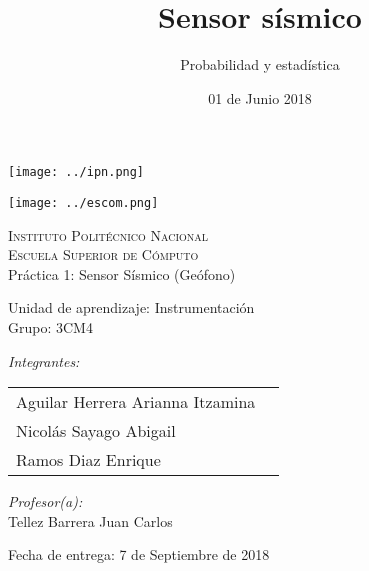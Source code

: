 \documentclass[12pt]{article}
\date{ 01 de Junio 2018}
\title{Sensor sísmico}
\author{Probabilidad y estadística}
\begin{document}
		\begin{titlepage}
			\begin{center}
				
				
				\noindent
				\begin{minipage}{0.5\textwidth}
					\begin{flushleft} \large
						\texttt{[image: ../ipn.png]}
					\end{flushleft}
				\end{minipage}%
				\begin{minipage}{0.55\textwidth}
					\begin{flushright} \large
						\texttt{[image: ../escom.png]}
					\end{flushright}
				\end{minipage}
				
				\textsc{\LARGE Instituto Politécnico Nacional}\\[0.5cm]
				
				\textsc{\Large Escuela Superior de Cómputo}\\[1cm]
				
				
				{ \huge Práctica 1: Sensor Sísmico (Geófono) \\[1cm] }
				
				{ \Large Unidad de aprendizaje: Instrumentación} \\[1cm]
				
				{ \Large Grupo: 3CM4 } \\[1cm]
				
				\noindent
				\begin{minipage}{0.5\textwidth}
					\begin{flushleft} \large
						\emph{Integrantes:}\\
						
						\begin{tabular}{ll}
						Aguilar Herrera Arianna Itzamina \\
					    Nicolás Sayago Abigail\\
					    Ramos Diaz Enrique \\
					\end{tabular}
					\end{flushleft}
				\end{minipage}%
				\begin{minipage}{0.5\textwidth}
					\begin{flushright} \large
						\emph{Profesor(a):} \\
						Tellez Barrera Juan Carlos  \\
					\end{flushright}
				\end{minipage}
				
				\vfill
				
				{\large Fecha de entrega: 7 de Septiembre de 2018}
			\end{center}
		\end{titlepage}
	
\end{document}
